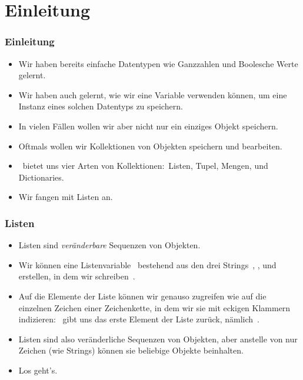 \documentclass[aspectratio=169,mathserif,notheorems]{beamer}%
\subtitle{17.~Listen}%
\begin{document}
%
%
\startPresentation%
%
\section{Einleitung}%
\begin{frame}%
\frametitle{Einleitung}%
\begin{itemize}%
\item Wir haben bereits einfache Datentypen wie Ganzzahlen und Boolesche Werte gelernt.%
%
\item<2-> Wir haben auch gelernt, wie wir eine Variable verwenden können, um eine Instanz eines solchen Datentyps zu speichern.%
%
\item<3-> In vielen Fällen wollen wir aber nicht nur ein einziges Objekt speichern.%
%
\item<4-> Oftmals wollen wir Kollektionen von Objekten speichern und bearbeiten\cite{PSF:P3D:TPSL:BIT,PSF:P3D:TPLR:DM,PSF:P3D:TPSL:CAABCFC}.%
%
\item<5-> \python\ bietet uns vier Arten von Kollektionen:~Listen, Tupel, Mengen, und Dictionaries.%
%
\item<6-> Wir fangen mit Listen an.%
%
\end{itemize}%
\end{frame}%
%
\begin{frame}%
\frametitle{Listen}%
\begin{itemize}%
\item Listen sind \emph{veränderbare} Sequenzen von Objekten.%
\item<2-> Wir können eine Listenvariable~ bestehend aus den drei Strings~, , und~ erstellen, in dem wir schreiben~.%
\item<3-> Auf die Elemente der Liste können wir genauso zugreifen wie auf die einzelnen Zeichen einer Zeichenkette, in dem wir sie mit eckigen Klammern indizieren\cite{PSF:P3D:TPLR:S}:~ gibt uns das erste Element der Liste zurück, nämlich~.
\item<4-> Listen sind also veränderliche Sequenzen von Objekten, aber anstelle von nur Zeichen (wie Strings) können sie beliebige Objekte beinhalten.%
\item<5-> Los geht's.%
\end{itemize}%
\end{frame}%
%
\end{document}
